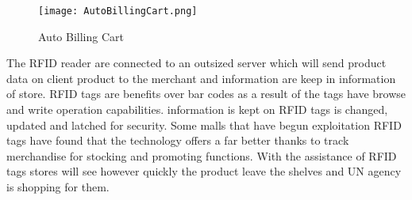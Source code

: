 \documentclass[12pt]{article}
\begin{document}
\begin{figure}
\texttt{[image: AutoBillingCart.png]}
\centering
\caption{Auto Billing Cart}
\end{figure}
\hspace*{1cm}The RFID reader are connected to an outsized server which will send product data on client product to the merchant and information are keep in information of store. RFID tags are benefits over bar codes as a result of the tags have browse and write operation capabilities. information is kept on RFID tags is changed, updated and latched for security. Some malls that have begun exploitation RFID tags have found that the technology offers a far better thanks to track merchandise for stocking and promoting functions. With the assistance of RFID tags stores will see however quickly the product leave the shelves and UN agency is shopping for them.
\end{document}

